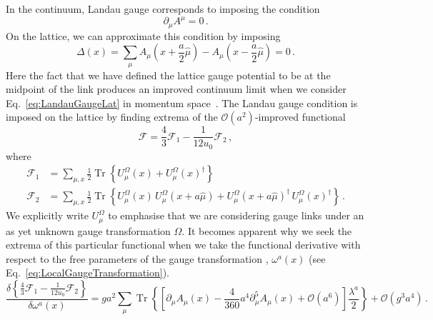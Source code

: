 In the continuum, Landau gauge corresponds to imposing the condition
\begin{equation}
\partial_\mu A^\mu = 0\, .
\label{eq:LandauGaugeCont}
\end{equation}
%
On the lattice, we can approximate this condition by imposing
\begin{equation}
\Delta(x) = \sum _ { \mu } A _ { \mu } \left( x + \frac{a}{2}\hat { \mu } \right) - A _ { \mu } \left( x-\frac{a}{2}\hat { \mu } \right) = 0\, .
\label{eq:LandauGaugeLat}
\end{equation}
Here the fact that we have defined the lattice gauge potential to be at the midpoint of the link produces an improved continuum limit when we consider Eq.~\eqref{eq:LandauGaugeLat} in momentum space~\cite{Alles:1996ka}. The Landau gauge condition is imposed on the lattice by finding extrema of the $\mathcal{O}(a^2)$-improved functional~\cite{Bonnet:1999mj}
%
\begin{equation}
\mathcal{F} =  \frac{4}{3}\mathcal{F}_1 - \frac{1}{12u_0}\mathcal{F}_2\, ,
\label{eq:LGFunctional}
\end{equation}
%
where
%
\begin{align*}
\mathcal{F}_1 &= \sum _ { \mu , x } \frac { 1 } { 2 } \operatorname { Tr } \left\{ U _ { \mu } ^ { \Omega } ( x ) + U _ { \mu } ^ { \Omega } ( x ) ^ { \dagger } \right\}\\
\mathcal{F}_2 &= \sum _ { \mu , x } \frac { 1 } { 2 } \operatorname { Tr } \left\{ U _ { \mu } ^ { \Omega } ( x ) \,U _ { \mu } ^ { \Omega } ( x + a\hat { \mu } ) + U _ { \mu } ^ { \Omega } ( x + a\hat { \mu } )^\dagger\, U _ { \mu } ^ { \Omega } ( x )^\dagger  \right\}\, .
\end{align*}
%
We explicitly write $U^\Omega_\mu$ to emphasise that we are considering gauge links under an as yet unknown gauge transformation $\Omega$. It becomes apparent why we seek the extrema of this particular functional when we take the functional derivative with respect to the free parameters of the gauge transformation , $\omega^a(x)$ (see Eq.~\eqref{eq:LocalGaugeTransformation}).
%
\begin{equation}
\frac { \delta \left\{ \frac { 4 } { 3 } \mathcal { F } _ { 1 } - \frac { 1 } { 12 u _ { 0 } } \mathcal { F } _ { 2 } \right\} } { \delta \omega ^ { a } ( x ) } = g a ^ { 2 } \sum _ { \mu } \operatorname { Tr } \left\{ \left[ \partial _ { \mu } A _ { \mu } ( x ) - \frac { 4 } { 360 } a ^ { 4 } \partial _ { \mu } ^ { 5 } A _ { \mu } ( x ) + \mathcal { O } \left( a ^ { 6 } \right) \right] \frac{\lambda^a}{2} \right\} + \mathcal { O } \left( g ^ { 3 } a ^ { 4 } \right)\, .
\label{eq:LGFunctionalDeriv}
\end{equation}
